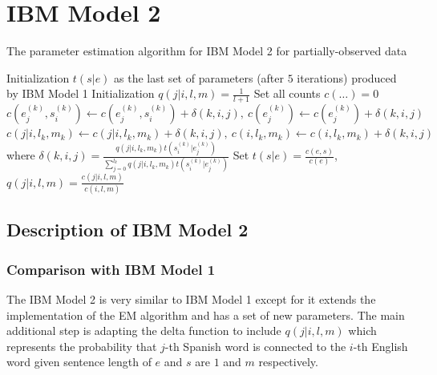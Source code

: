 \section{\textbf{IBM Model 2}}

\begin{algorithm*}[ht]
  \caption{The parameter estimation algorithm for IBM Model 2 for partially-observed data}
  \label{algo:ibm2}
  Initialization $t(s|e)$ as the last set of parameters (after $5$ iterations) produced by IBM Model 1\;
  Initialization $q(j|i,l,m)=\frac{1}{l+1}$\;
  {
    Set all counts $c(\dots)=0$\;
    {
        {
            {
                $c\left(e_{j}^{(k)}, s_{i}^{(k)}\right) \leftarrow c\left(e_{j}^{(k)}, s_{i}^{(k)}\right)+\delta(k, i, j), \ c\left(e_{j}^{(k)}\right)\leftarrow c\left(e_{j}^{(k)}\right)+\delta(k, i, j)$\;
                $c\left(j | i, l_{k}, m_{k}\right) \leftarrow c\left(j | i, l_{k}, m_{k}\right)+\delta(k, i, j), \ c\left(i, l_{k}, m_{k}\right) \leftarrow c\left(i, l_{k}, m_{k}\right)+\delta(k, i, j)$\;
                where $\delta(k, i, j)=\frac{q\left(j | i, l_{k}, m_{k}\right) t\left(s_{i}^{(k)} | e_{j}^{(k)}\right)}{\sum_{j=0}^{l_{k}} q\left(j | i, l_{k}, m_{k}\right) t\left(s_{i}^{(k)} | e_{j}^{(k)}\right)}$
            }
        }
    }
    Set $t(s | e)=\frac{c(e, s)}{c(e)}$, $q(j|i,l,m)=\frac{c(j|i,l,m)}{c(i,l,m)}$\;
  }
\end{algorithm*}


\subsection{\textbf{Description of IBM Model 2}}

\subsubsection{\textbf{Comparison with IBM Model 1}}

The IBM Model 2 is very similar to IBM Model 1 except for it extends the implementation of the EM algorithm and has a set of new parameters. The main additional step is adapting the delta function to include $q(j|i,l,m)$ which represents the probability that $j$-th Spanish word is connected to the $i$-th English word given sentence length of $e$ and $s$ are $1$ and $m$ respectively.


